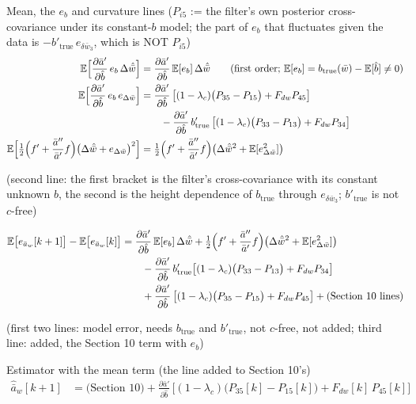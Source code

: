 \documentclass[11pt,a4paper,fontset=none]{ctexart}
\newcommand{\ba}{\bar{a}}
\newcommand{\bw}{\bar{w}}
\newcommand{\E}{\mathbb{E}}
\newcommand{\dWh}{\Delta\hat{\bw}}
\newcommand{\eD}{e_{\Delta\bw}}
\newcommand{\ap}{\ba'}
\newcommand{\app}{\ba''}
\begin{document}
Mean, the $e_b$ and curvature lines ($P_{i5}$ := the filter's own posterior cross-covariance under its constant-$b$ model;
the part of $e_b$ that fluctuates given the data is $-b'_{\mathrm{true}}\,e_{\delta\bw_3}$, which is NOT $P_{i5}$)
\begin{align*}
\E\Bigl[\frac{\partial\ap}{\partial\hat{b}}\,e_b\,\dWh\Bigr] &= \frac{\partial\ap}{\partial\hat{b}}\,\E[e_b]\,\dWh
  \qquad (\text{first order; } \E[e_b] = b_{\mathrm{true}}(\bw) - \E[\hat{b}] \neq 0) \\
\E\Bigl[\frac{\partial\ap}{\partial\hat{b}}\,e_b\,\eD\Bigr]
  &= \frac{\partial\ap}{\partial\hat{b}}\,\bigl[(1-\lambda_c)\bigl(P_{35} - P_{15}\bigr) + F_{dw}P_{45}\bigr] \\
  &\qquad - \frac{\partial\ap}{\partial\hat{b}}\,b'_{\mathrm{true}}\,\bigl[(1-\lambda_c)\bigl(P_{33} - P_{13}\bigr) + F_{dw}P_{34}\bigr] \\
\E\Bigl[\tfrac{1}{2}\Bigl(f' + \frac{\app}{\ap}f\Bigr)\bigl(\dWh + \eD\bigr)^{2}\Bigr]
  &= \tfrac{1}{2}\Bigl(f' + \frac{\app}{\ap}f\Bigr)\bigl(\dWh^{2} + \E[\eD^{2}]\bigr)
\end{align*}

(second line: the first bracket is the filter's cross-covariance with its constant unknown $b$, the second is the
height dependence of $b_{\mathrm{true}}$ through $e_{\delta\bw_3}$; $b'_{\mathrm{true}}$ is not $c$-free)

\begin{align*}
\E\bigl[e_{\ba_w}[k+1]\bigr] - \E\bigl[e_{\ba_w}[k]\bigr]
  &= \frac{\partial\ap}{\partial\hat{b}}\,\E[e_b]\,\dWh
     + \tfrac{1}{2}\Bigl(f' + \frac{\app}{\ap}f\Bigr)\bigl(\dWh^{2} + \E[\eD^{2}]\bigr) \\
  &\qquad - \frac{\partial\ap}{\partial\hat{b}}\,b'_{\mathrm{true}}\bigl[(1-\lambda_c)\bigl(P_{33} - P_{13}\bigr) + F_{dw}P_{34}\bigr] \\
  &\qquad + \frac{\partial\ap}{\partial\hat{b}}\,\bigl[(1-\lambda_c)\bigl(P_{35} - P_{15}\bigr) + F_{dw}P_{45}\bigr]
     + \text{(Section 10 lines)}
\end{align*}

(first two lines: model error, needs $b_{\mathrm{true}}$ and $b'_{\mathrm{true}}$, not $c$-free, not added; third line: added, the Section 10 term with $e_b$)

Estimator with the mean term (the line added to Section 10's)
\begin{align*}
\hat{\ba}_w[k+1] &= \text{(Section 10)} + \frac{\partial\ap}{\partial\hat{b}}\,\bigl[(1-\lambda_c)\bigl(P_{35}[k] - P_{15}[k]\bigr) + F_{dw}[k]\,P_{45}[k]\bigr]
\end{align*}
\end{document}
